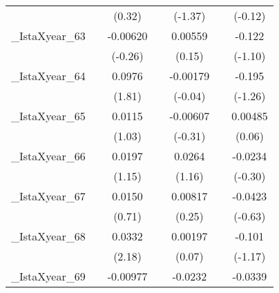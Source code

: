 {\begin{tabular}{l*{6}{c}}
            &                     &      (0.32)         &                     &     (-1.37)         &                     &     (-0.12)         \\
[1em]
\_IstaXyear\_63&                     &    -0.00620         &                     &     0.00559         &                     &      -0.122         \\
            &                     &     (-0.26)         &                     &      (0.15)         &                     &     (-1.10)         \\
[1em]
\_IstaXyear\_64&                     &      0.0976         &                     &    -0.00179         &                     &      -0.195         \\
            &                     &      (1.81)         &                     &     (-0.04)         &                     &     (-1.26)         \\
[1em]
\_IstaXyear\_65&                     &      0.0115         &                     &    -0.00607         &                     &     0.00485         \\
            &                     &      (1.03)         &                     &     (-0.31)         &                     &      (0.06)         \\
[1em]
\_IstaXyear\_66&                     &      0.0197         &                     &      0.0264         &                     &     -0.0234         \\
            &                     &      (1.15)         &                     &      (1.16)         &                     &     (-0.30)         \\
[1em]
\_IstaXyear\_67&                     &      0.0150         &                     &     0.00817         &                     &     -0.0423         \\
            &                     &      (0.71)         &                     &      (0.25)         &                     &     (-0.63)         \\
[1em]
\_IstaXyear\_68&                     &      0.0332\sym{*}  &                     &     0.00197         &                     &      -0.101         \\
            &                     &      (2.18)         &                     &      (0.07)         &                     &     (-1.17)         \\
[1em]
\_IstaXyear\_69&                     &    -0.00977         &                     &     -0.0232         &                     &     -0.0339         \\

\end{tabular}}
